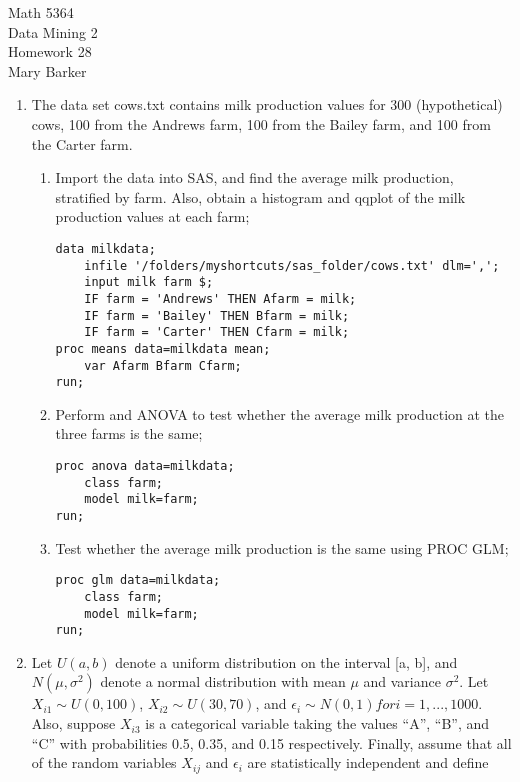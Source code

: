 \documentclass[11pt]{article}
\begin{document}
\noindent\large{Math 5364}\\
\large{Data Mining 2}\\
\large{Homework 28}\\
\large{Mary Barker}

\begin{enumerate}
\item The data set cows.txt contains milk production 
	values for 300 (hypothetical) cows, 100 from 
	the Andrews farm, 100 from the Bailey farm, and 
	100 from the Carter farm. 
	
	\begin{enumerate}
	\item Import the data into SAS, and find the 
		average milk production, stratified by farm. 
		Also, obtain a histogram and qqplot of the 
		milk production values at each farm;

\begin{Verbatim}
data milkdata;
    infile '/folders/myshortcuts/sas_folder/cows.txt' dlm=',';
    input milk farm $;
    IF farm = 'Andrews' THEN Afarm = milk;
    IF farm = 'Bailey' THEN Bfarm = milk;
    IF farm = 'Carter' THEN Cfarm = milk;
proc means data=milkdata mean;
	var Afarm Bfarm Cfarm;
run;
\end{Verbatim}

	\item Perform and ANOVA to test whether the average 
		milk production at the three farms is the same;

\begin{Verbatim}
proc anova data=milkdata;
	class farm;
	model milk=farm;
run;
\end{Verbatim}


	\item Test whether the average milk production is 
		the same using PROC GLM;

\begin{Verbatim}
proc glm data=milkdata;
	class farm;
	model milk=farm;
run;
\end{Verbatim}
	\end{enumerate}

\item Let $U(a, b)$ denote a uniform distribution on the 
	interval [a, b], and $N(\mu, \sigma^2)$ denote a normal 
	distribution with mean $\mu$ and variance $\sigma^2$. Let 
	$X_{i1} \mathtt{\sim} U(0, 100)$, $X_{i2} \mathtt{\sim} U(30, 70)$, and 
	$\epsilon_i \mathtt{\sim} N(0, 1) for i = 1, ... , 1000$. Also, suppose 
	$X_{i3}$ is a categorical variable taking the values ``A'', 
	``B'', and ``C'' with probabilities 0.5, 0.35, and 0.15 
	respectively. Finally, assume that all of the random 
	variables $X_{ij}$ and $\epsilon_i$ are statistically independent 
	and define 


\end{enumerate}
\end{document}
